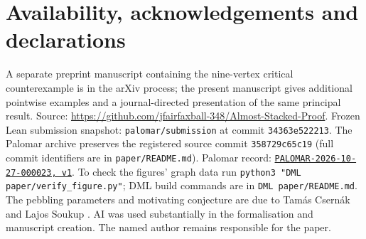 \documentclass[10pt,a4paper]{article}
\newcommand{\PalomarEntry}{\href{https://palomar-registry.org/entry.html?id=PALOMAR-2026-10-27-000023\&version=1}{\texttt{PALOMAR-2026-10-27-000023, v1}}}
\begin{document}
\section*{Availability, acknowledgements and declarations}
A separate preprint manuscript containing the nine-vertex critical
counterexample is in the arXiv process; the present manuscript gives
additional pointwise examples and a journal-directed presentation of the
same principal result. Source: \url{https://github.com/jfairfaxball-348/Almost-Stacked-Proof}. Frozen Lean submission snapshot: \texttt{palomar/submission} at commit \texttt{34363e522213}. The Palomar archive preserves the registered source commit \texttt{358729c65c19} (full commit identifiers are in \texttt{paper/README.md}). Palomar record: \PalomarEntry. To check the figures' graph data run \texttt{python3 "DML paper/verify\_figure.py"}; DML build commands are in \texttt{DML paper/README.md}. The pebbling parameters and motivating conjecture are due to Tam\'as Csern\'ak and Lajos Soukup \cite{CSApril,CSOctober}. AI was used substantially in the formalisation and manuscript creation. The named author remains responsible for the paper.


\end{document}

